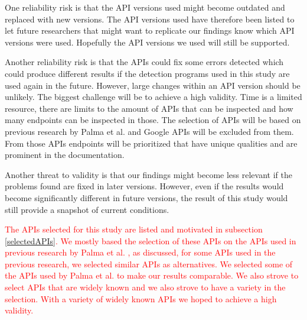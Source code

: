 One reliability risk is that the API versions used might become outdated and replaced with new versions. The API versions used have therefore been listed to let future researchers that might want to replicate our findings know which API versions were used. Hopefully the API versions we used will still be supported.

Another reliability risk is that the APIs could fix some errors detected which could produce different results if the detection programs used in this study are used again in the future. However, large changes within an API version should be unlikely. 
The biggest challenge will be to achieve a high validity. Time is a limited resource, there are limits to the amount of APIs that can be inspected and how many endpoints can be inspected in those. The  selection of APIs will be based on previous research by Palma et al. \cite{linguistic} and Google APIs will be excluded from them. From those APIs endpoints will be prioritized that have unique qualities and are prominent in the documentation. 

Another threat to validity is that our findings might become less relevant if the problems found are fixed in later versions. However, even if the results would become significantly different in future versions, the result of this study would still provide a snapshot of current conditions. 

\textcolor{red}{
The APIs selected for this study are listed and motivated in subsection \ref{selectedAPIs}. We mostly based the selection of these APIs on the APIs used in previous research by Palma et al. \cite{design}\cite{linguistic}, as discussed, for some APIs used in the previous research, we selected similar APIs as alternatives. We selected some of the APIs used by Palma et al. to make our results comparable. We also strove to select APIs that are widely known and we also strove to have a variety in the selection. With a variety of widely known APIs we hoped to achieve a high validity.
}

\clearpage
\newpage